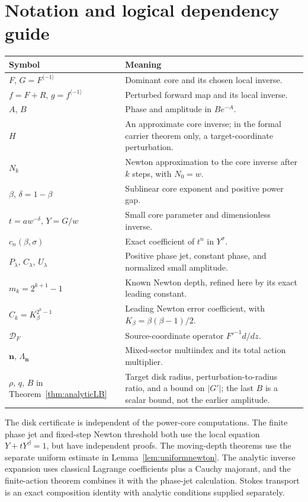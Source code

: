 \documentclass[11pt,a4paper]{article}
\theoremstyle{definition}
\theoremstyle{remark}
\newcommand{\DF}{\mathcal D_F}
\newcommand{\nn}{\boldsymbol n}
\newcommand{\rev}{^{\langle-1\rangle}}
\numberwithin{equation}{section}
\begin{document}
\appendix
\section{Notation and logical dependency guide}\label{sec:notation}

\begin{longtable}{@{}>{\raggedright\arraybackslash}p{}>{\raggedright\arraybackslash}p{}@{}}
\toprule
Symbol & Meaning\\
\midrule
\endhead
$F$, $G=F\rev$ & Dominant core and its chosen local inverse.\\
$f=F+R$, $g=f\rev$ & Perturbed forward map and its local inverse.\\
$A$, $B$ & Phase and amplitude in $B e^{-A}$.\\
$H$ & An approximate core inverse; in the formal carrier theorem only, a target-coordinate perturbation.\\
$N_k$ & Newton approximation to the core inverse after $k$ steps, with $N_0=w$.\\
$\beta$, $\delta=1-\beta$ & Sublinear core exponent and positive power gap.\\
$t=aw^{-\delta}$, $Y=G/w$ & Small core parameter and dimensionless inverse.\\
$c_n(\beta,\sigma)$ & Exact coefficient of $t^n$ in $Y^\sigma$.\\
$P_\lambda$, $C_\lambda$, $U_\lambda$ & Positive phase jet, constant phase, and normalized small amplitude.\\
$m_k=2^{k+1}-1$ & Known Newton depth, refined here by its exact leading constant.\\
$C_k=K_\beta^{2^k-1}$ & Leading Newton error coefficient, with $K_\beta=\beta(\beta-1)/2$.\\
$\DF$ & Source-coordinate operator $F'^{-1}d/dz$.\\
$\nn$, $\Lambda_{\nn}$ & Mixed-sector multiindex and its total action multiplier.\\
$\rho$, $q$, $B$ in Theorem~\ref{thm:analyticLB} & Target disk radius, perturbation-to-radius ratio, and a bound on $|G'|$; the last $B$ is a scalar bound, not the earlier amplitude.\\
\bottomrule
\end{longtable}

The disk certificate is independent of the power-core computations. The finite phase jet and fixed-step Newton threshold both use the local equation $Y+tY^\beta=1$, but have independent proofs. The moving-depth theorems use the separate uniform estimate in Lemma~\ref{lem:uniformnewton}. The analytic inverse expansion uses classical Lagrange coefficients plus a Cauchy majorant, and the finite-action theorem combines it with the phase-jet calculation. Stokes transport is an exact composition identity with analytic conditions supplied separately.
\end{document}
